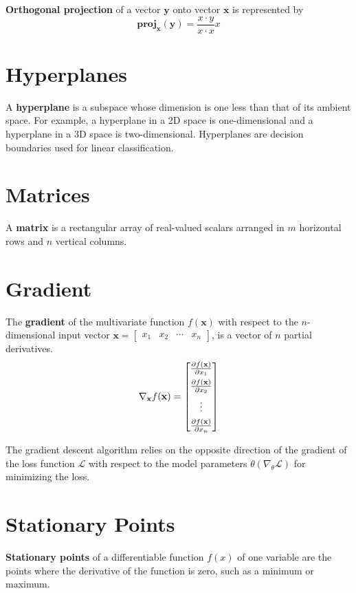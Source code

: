 \documentclass{article}
\begin{document}
\textbf{Orthogonal projection} of a vector $\mathbf{y}$ onto vector $\mathbf{x}$ is represented by
\[\mathbf{proj}_\mathbf{x}(\mathbf{y})=\frac{x\cdot y}{x\cdot x}x\]

\section*{Hyperplanes}
A \textbf{hyperplane} is a subspace whose dimension is one less than that of its ambient space. For example, a hyperplane in a 2D space is one-dimensional and a hyperplane in a 3D space is two-dimensional. Hyperplanes are decision boundaries used for linear classification.

\section*{Matrices}
A \textbf{matrix} is a rectangular array of real-valued scalars arranged in $m$ horizontal rows and $n$ vertical columns.

\section*{Gradient}
The \textbf{gradient} of the multivariate function $f(\mathbf{x})$ with respect to the $n$-dimensional input vector $\mathbf{x}=\begin{bmatrix}
    x_1 & x_2 & \cdots & x_n
\end{bmatrix}$, is a vector of $n$ partial derivatives.
\[\nabla_\mathbf{x} f(\mathbf{x})={\begin{bmatrix}
    \frac{\partial f(\mathbf{x})}{\partial x_1} \vspace{4pt}\\
    \frac{\partial f(\mathbf{x})}{\partial x_2} \vspace{4pt}\\
    \vdots \vspace{4pt}\\
    \frac{\partial f(\mathbf{x})}{\partial x_n}
\end{bmatrix}}\]

The gradient descent algorithm relies on the opposite direction of the gradient of the loss function $\mathcal{L}$ with respect to the model parameters $\theta (\nabla_\theta \mathcal{L})$ for minimizing the loss.

\section*{Stationary Points}
\textbf{Stationary points} of a differentiable function $f(x)$ of one variable are the points where the derivative of the function is zero, such as a minimum or maximum.
\end{document}

